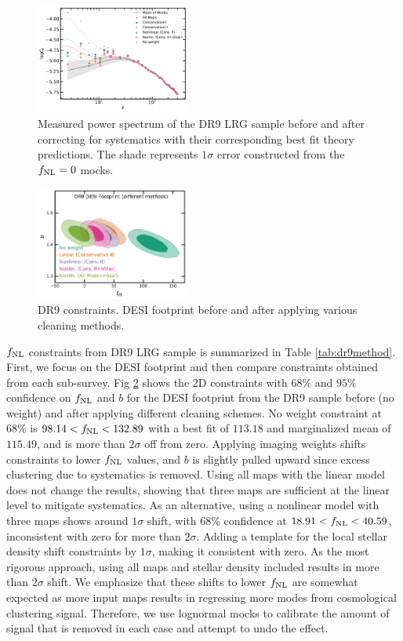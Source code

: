 \begin{figure}
    \centering
    \includegraphics[width=0.45\textwidth]{figures/model_dr9.pdf} 
    \caption{Measured power spectrum of the DR9 LRG sample before and after correcting for systematics with their corresponding best fit theory predictions. The shade represents $1\sigma$ error constructed from the $f_{\rm NL}=0$ mocks.}
    \label{fig:cl_dr9}
\end{figure}

\begin{figure}
    \centering
    \includegraphics[width=0.45\textwidth]{figures/mcmc_dr9methods.pdf} 
    \caption{DR9 constraints. DESI footprint before and after applying various cleaning methods.}\label{fig:mcmc_dr9}
\end{figure}

$f_{\rm NL}$ constraints from DR9 LRG sample is summarized in Table \ref{tab:dr9method}. First, we focus on the DESI footprint and then compare constraints obtained from each sub-survey. Fig \ref{fig:mcmc_dr9} shows the 2D constraints with $68\%$ and $95\%$ confidence on $f_{\rm NL}$ and $b$ for the DESI footprint from the DR9 sample before (no weight) and after applying different cleaning schemes. No weight constraint at $68\%$ is $98.14<f_{\rm NL}<132.89$ with a best fit of $113.18$ and marginalized mean of $115.49$, and is more than $2\sigma$ off from zero. Applying imaging weights shifts constraints to lower $f_{\rm NL}$ values, and $b$ is slightly pulled upward since excess clustering due to systematics is removed. Using all maps with the linear model does not change the results, showing that three maps are sufficient at the linear level to mitigate systematics.  As an alternative, using a nonlinear model with three maps shows around $1\sigma$ shift, with $68\%$ confidence at $18.91<f_{\rm NL}<40.59$, inconsistent with zero for more than $2\sigma$. Adding a template for the local stellar density shift constraints by $1\sigma$, making it consistent with zero. As the most rigorous approach, using all maps and stellar density included results in more than $2\sigma$ shift. We emphasize that these shifts to lower $f_{\rm NL}$ are somewhat expected as more input maps results in regressing more modes from cosmological clustering signal. Therefore, we use lognormal mocks to calibrate the amount of signal that is removed in each case and attempt to undo the effect.


